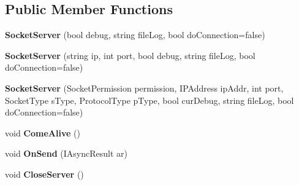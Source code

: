 \subsection*{Public Member Functions}
\begin{DoxyCompactItemize}
\item 
\mbox{\label{class_lerp2_a_p_i_1_1_communication_1_1_sockets_1_1_socket_server_a0345e504a8bbd0b825865dfd58693b37}} 
{\bfseries Socket\+Server} (bool debug, string file\+Log, bool do\+Connection=false)
\item 
\mbox{\label{class_lerp2_a_p_i_1_1_communication_1_1_sockets_1_1_socket_server_aae16b2d142302a8442c85eaa5816d12b}} 
{\bfseries Socket\+Server} (string ip, int port, bool debug, string file\+Log, bool do\+Connection=false)
\item 
\mbox{\label{class_lerp2_a_p_i_1_1_communication_1_1_sockets_1_1_socket_server_a6d7ed3dc2852751fe7b5bbcde9f69d9b}} 
{\bfseries Socket\+Server} (Socket\+Permission permission, I\+P\+Address ip\+Addr, int port, Socket\+Type s\+Type, Protocol\+Type p\+Type, bool cur\+Debug, string file\+Log, bool do\+Connection=false)
\item 
\mbox{\label{class_lerp2_a_p_i_1_1_communication_1_1_sockets_1_1_socket_server_a7782b604119b7ea3f1b0bf46781a8047}} 
void {\bfseries Come\+Alive} ()
\item 
\mbox{\label{class_lerp2_a_p_i_1_1_communication_1_1_sockets_1_1_socket_server_aae56222526c8f6e8aca309960e07def9}} 
void {\bfseries On\+Send} (I\+Async\+Result ar)
\item 
\mbox{\label{class_lerp2_a_p_i_1_1_communication_1_1_sockets_1_1_socket_server_a6af5fb9d8c9e173103bc5c782a34d05a}} 
void {\bfseries Close\+Server} ()
\end{DoxyCompactItemize}
